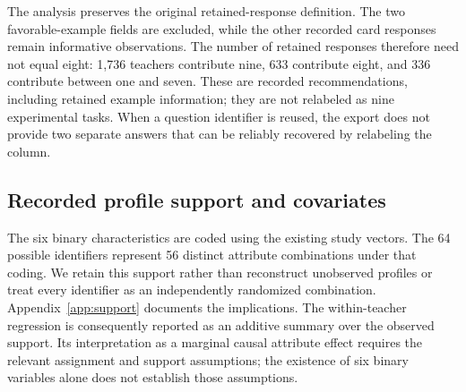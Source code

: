 The analysis preserves the original retained-response definition. The two favorable-example fields are excluded, while the other recorded card responses remain informative observations. The number of retained responses therefore need not equal eight: 1,736 teachers contribute nine, 633 contribute eight, and 336 contribute between one and seven. These are recorded recommendations, including retained example information; they are not relabeled as nine experimental tasks. When a question identifier is reused, the export does not provide two separate answers that can be reliably recovered by relabeling the column.

\begin{figure}[!htbp]\centering\color{added}
\caption{}\label{fig:timelineA}
\end{figure}

\subsection{Recorded profile support and covariates}
The six binary characteristics are coded using the existing study vectors. The 64 possible identifiers represent 56 distinct attribute combinations under that coding. We retain this support rather than reconstruct unobserved profiles or treat every identifier as an independently randomized combination. Appendix~\ref{app:support} documents the implications. The within-teacher regression is consequently reported as an additive summary over the observed support. Its interpretation as a marginal causal attribute effect requires the relevant assignment and support assumptions; the existence of six binary variables alone does not establish those assumptions.

